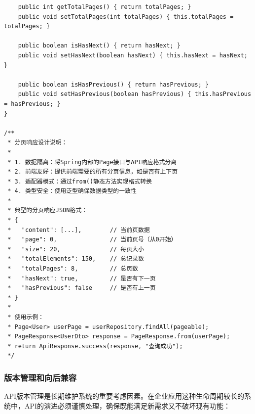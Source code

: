 \begin{verbatim}
    public int getTotalPages() { return totalPages; }
    public void setTotalPages(int totalPages) { this.totalPages = totalPages; }
    
    public boolean isHasNext() { return hasNext; }
    public void setHasNext(boolean hasNext) { this.hasNext = hasNext; }
    
    public boolean isHasPrevious() { return hasPrevious; }
    public void setHasPrevious(boolean hasPrevious) { this.hasPrevious = hasPrevious; }
}

/**
 * 分页响应设计说明：
 * 
 * 1. 数据隔离：将Spring内部的Page接口与API响应格式分离
 * 2. 前端友好：提供前端需要的所有分页信息，如是否有上下页
 * 3. 适配器模式：通过from()静态方法实现格式转换
 * 4. 类型安全：使用泛型确保数据类型的一致性
 * 
 * 典型的分页响应JSON格式：
 * {
 *   "content": [...],        // 当前页数据
 *   "page": 0,               // 当前页号（从0开始）
 *   "size": 20,              // 每页大小
 *   "totalElements": 150,    // 总记录数
 *   "totalPages": 8,         // 总页数
 *   "hasNext": true,         // 是否有下一页
 *   "hasPrevious": false     // 是否有上一页
 * }
 * 
 * 使用示例：
 * Page<User> userPage = userRepository.findAll(pageable);
 * PageResponse<UserDto> response = PageResponse.from(userPage);
 * return ApiResponse.success(response, "查询成功");
 */
\end{verbatim}

\subsubsection{版本管理和向后兼容}\label{ux7248ux672cux7ba1ux7406ux548cux5411ux540eux517cux5bb9}

API版本管理是长期维护系统的重要考虑因素。在企业应用这种生命周期较长的系统中，API的演进必须谨慎处理，确保既能满足新需求又不破坏现有功能：

